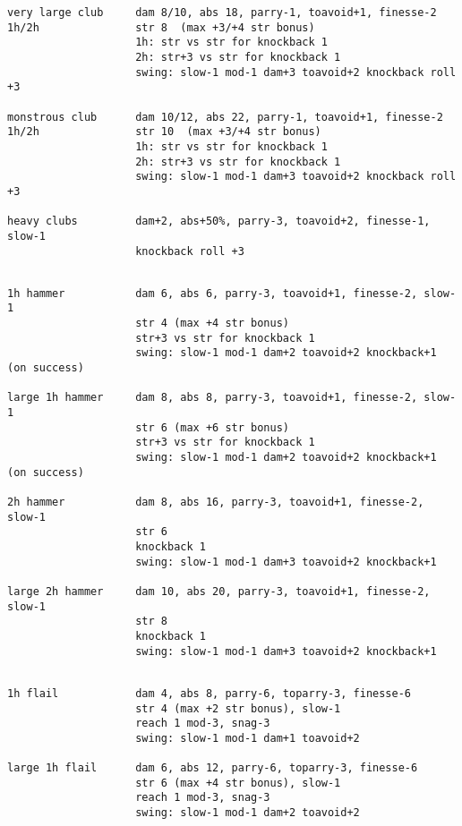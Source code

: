 \begin{verbatim}
very large club     dam 8/10, abs 18, parry-1, toavoid+1, finesse-2
1h/2h               str 8  (max +3/+4 str bonus)
                    1h: str vs str for knockback 1
                    2h: str+3 vs str for knockback 1
                    swing: slow-1 mod-1 dam+3 toavoid+2 knockback roll +3

monstrous club      dam 10/12, abs 22, parry-1, toavoid+1, finesse-2
1h/2h               str 10  (max +3/+4 str bonus)
                    1h: str vs str for knockback 1
                    2h: str+3 vs str for knockback 1
                    swing: slow-1 mod-1 dam+3 toavoid+2 knockback roll +3

heavy clubs         dam+2, abs+50%, parry-3, toavoid+2, finesse-1, slow-1
                    knockback roll +3


\end{verbatim} \pagebreak[1] \begin{verbatim}
1h hammer           dam 6, abs 6, parry-3, toavoid+1, finesse-2, slow-1
                    str 4 (max +4 str bonus)
                    str+3 vs str for knockback 1
                    swing: slow-1 mod-1 dam+2 toavoid+2 knockback+1 (on success)

large 1h hammer     dam 8, abs 8, parry-3, toavoid+1, finesse-2, slow-1
                    str 6 (max +6 str bonus)
                    str+3 vs str for knockback 1
                    swing: slow-1 mod-1 dam+2 toavoid+2 knockback+1 (on success)

2h hammer           dam 8, abs 16, parry-3, toavoid+1, finesse-2, slow-1
                    str 6
                    knockback 1
                    swing: slow-1 mod-1 dam+3 toavoid+2 knockback+1

large 2h hammer     dam 10, abs 20, parry-3, toavoid+1, finesse-2, slow-1
                    str 8
                    knockback 1
                    swing: slow-1 mod-1 dam+3 toavoid+2 knockback+1


\end{verbatim} \pagebreak[1] \begin{verbatim}
1h flail            dam 4, abs 8, parry-6, toparry-3, finesse-6
                    str 4 (max +2 str bonus), slow-1
                    reach 1 mod-3, snag-3
                    swing: slow-1 mod-1 dam+1 toavoid+2

large 1h flail      dam 6, abs 12, parry-6, toparry-3, finesse-6
                    str 6 (max +4 str bonus), slow-1
                    reach 1 mod-3, snag-3
                    swing: slow-1 mod-1 dam+2 toavoid+2


\end{verbatim}
